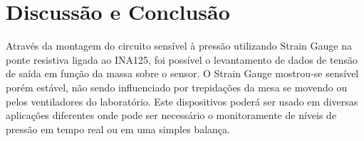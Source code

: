 \newpage
\section{Discussão e Conclusão}
Através da montagem do circuito sensível à pressão utilizando Strain Gauge na ponte resistiva ligada ao INA125, foi possível o levantamento de dados de tensão de saída em função da massa sobre o sensor. O Strain Gauge mostrou-se sensível porém estável, não sendo influenciado por trepidações da mesa se movendo ou pelos ventiladores do laboratório. Este dispositivos poderá ser usado em diversas aplicações diferentes onde pode ser necessário o monitoramente de níveis de pressão em tempo real ou em uma simples balança.